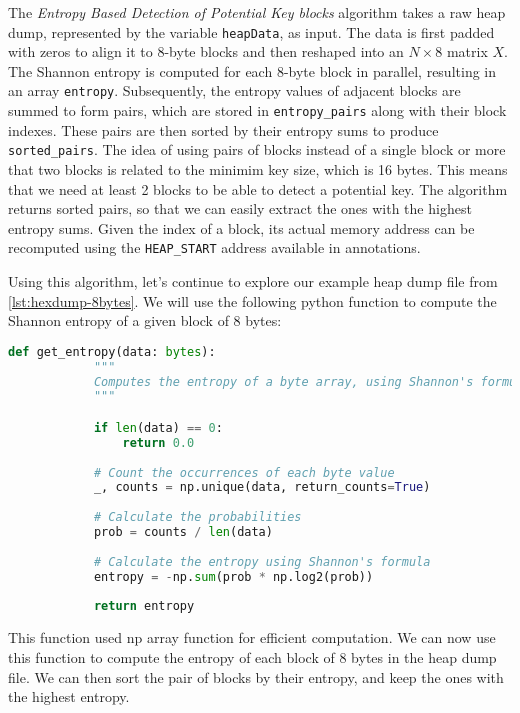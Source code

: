     The \textit{Entropy Based Detection of Potential Key blocks} algorithm takes a raw heap dump, represented by the variable \texttt{heapData}, as input. The data is first padded with zeros to align it to 8-byte blocks and then reshaped into an $N \times 8$ matrix $X$. The Shannon entropy is computed for each 8-byte block in parallel, resulting in an array \texttt{entropy}. Subsequently, the entropy values of adjacent blocks are summed to form pairs, which are stored in \texttt{entropy\_pairs} along with their block indexes. These pairs are then sorted by their entropy sums to produce \texttt{sorted\_pairs}. The idea of using pairs of blocks instead of a single block or more that two blocks is related to the minimim key size, which is 16 bytes. This means that we need at least 2 blocks to be able to detect a potential key. The algorithm returns sorted pairs, so that we can easily extract the ones with the highest entropy sums. Given the index of a block, its actual memory address can be recomputed using the \texttt{HEAP\_START} address available in annotations.
    
    Using this algorithm, let's continue to explore our example heap dump file from \ref{lst:hexdump-8bytes}. We will use the following python function to compute the Shannon entropy of a given block of 8 bytes:

    \begin{minipage}{\dimexpr\linewidth-20pt}
    \begin{lstlisting}[language=python, caption={Python function to compute the Shannon entropy of a given block of 8 bytes}]
        def get_entropy(data: bytes):
            """
            Computes the entropy of a byte array, using Shannon's formula.
            """

            if len(data) == 0:
                return 0.0
            
            # Count the occurrences of each byte value
            _, counts = np.unique(data, return_counts=True)
            
            # Calculate the probabilities
            prob = counts / len(data)
            
            # Calculate the entropy using Shannon's formula
            entropy = -np.sum(prob * np.log2(prob))
            
            return entropy
    \end{lstlisting}
    \end{minipage}

    This function used np array function for efficient computation. We can now use this function to compute the entropy of each block of 8 bytes in the heap dump file. We can then sort the pair of blocks by their entropy, and keep the ones with the highest entropy.
    
